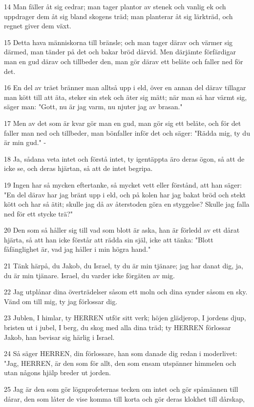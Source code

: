 \par 14 Man fäller åt sig cedrar; man tager plantor av stenek och vanlig ek och uppdrager dem åt sig bland skogens träd; man planterar åt sig lärkträd, och regnet giver dem växt.
\par 15 Detta hava människorna till bränsle; och man tager därav och värmer sig därmed, man tänder på det och bakar bröd därvid. Men därjämte förfärdigar man en gud därav och tillbeder den, man gör därav ett beläte och faller ned för det.
\par 16 En del av träet bränner man alltså upp i eld, över en annan del därav tillagar man kött till att äta, steker sin stek och äter sig mätt; när man så har värmt sig, säger man: "Gott, nu är jag varm, nu njuter jag av brasan."
\par 17 Men av det som är kvar gör man en gud, man gör sig ett beläte, och för det faller man ned och tillbeder, man bönfaller inför det och säger: "Rädda mig, ty du är min gud." -
\par 18 Ja, sådana veta intet och förstå intet, ty igentäppta äro deras ögon, så att de icke se, och deras hjärtan, så att de intet begripa.
\par 19 Ingen har så mycken eftertanke, så mycket vett eller förstånd, att han säger: "En del därav har jag bränt upp i eld, och på kolen har jag bakat bröd och stekt kött och har så ätit; skulle jag då av återstoden göra en styggelse? Skulle jag falla ned för ett stycke trä?"
\par 20 Den som så håller sig till vad som blott är aska, han är förledd av ett dårat hjärta, så att han icke förstår att rädda sin själ, icke att tänka: "Blott fåfänglighet är, vad jag håller i min högra hand."
\par 21 Tänk härpå, du Jakob, du Israel, ty du är min tjänare; jag har danat dig, ja, du är min tjänare. Israel, du varder icke förgäten av mig.
\par 22 Jag utplånar dina överträdelser såsom ett moln och dina synder såsom en sky. Vänd om till mig, ty jag förlossar dig.
\par 23 Jublen, I himlar, ty HERREN utför sitt verk; höjen glädjerop, I jordens djup, bristen ut i jubel, I berg, du skog med alla dina träd; ty HERREN förlossar Jakob, han bevisar sig härlig i Israel.
\par 24 Så säger HERREN, din förlossare, han som danade dig redan i moderlivet: "Jag, HERREN, är den som för allt, den som ensam utspänner himmelen och utan någons hjälp breder ut jorden.
\par 25 Jag är den som gör lögnprofeternas tecken om intet och gör spåmännen till dårar, den som låter de vise komma till korta och gör deras klokhet till dårskap,
